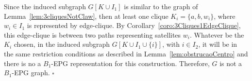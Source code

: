 \documentclass[9pt]{entcs}
\newtheorem{lema}[thm]{Lemma}%
\newtheorem{defi}[thm]{Definition}%
\begin{document}
\begin{pf}
Since the induced subgraph $G[K\cup I_1]$ is similar to the graph of Lemma~\ref{lem:3cliquesNotClaw}, then at least one clique $K_i = \{a,b,w_i\}$, where $w_i \in I_1$ is represented by edge-clique. By Corollary~\ref{coro:3Cliques1EdgeClique}, this edge-clique is between two paths representing satellites $w_i$. Whatever be the $K_i$ chosen, in the induced subgraph $G[K\cup I_1 \cup \{i\}]$, with $i\in I_2$, it will be in the same restriction conditions as described in Lemma~\ref{lem:obstrucaoCentro} and there is no a $B_1$-EPG representation for this construction. Therefore, $G$ is not a  $B_1$-EPG graph.
 $\square$\end{pf}





%

\end{document}
